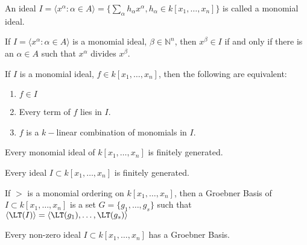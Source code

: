             \begin{definition}
                An ideal
                $I=\langle{x}^{\alpha}:\alpha\in{A}\rangle%
                  =\{\sum_{\alpha}h_{\alpha}x^\alpha,h_{\alpha}%
                   \in k[x_1,\hdots ,x_n]\}$
                is called a monomial ideal.
            \end{definition}
            \begin{theorem}
                If $I=\langle{x}^\alpha:\alpha\in{A}\rangle$
                is a monomial ideal,
                $\beta\in\mathbb{N}^n$, then $x^\beta\in{I}$
                if and only if there is an $\alpha\in{A}$
                such that $x^{\alpha}$ divides $x^{\beta}$.
            \end{theorem}
            \begin{theorem}
                If $I$ is a monomial ideal,
                $f\in{k}[x_1,\hdots ,x_n]$,
                then the following are equivalent:
                \begin{enumerate}
                    \item $f\in I$
                    \item Every term of $f$ lies in $I$.
                    \item $f$ is a $k-$linear combination of
                          monomials in $I$.
                \end{enumerate}
            \end{theorem}
            \begin{theorem}
                Every monomial ideal of $k[x_{1},\hdots,x_{n}]$
                is finitely generated.
            \end{theorem}
            \begin{theorem}
                Every ideal $I\subset{k}[x_{1},\hdots,x_{n}]$
                is finitely generated.
            \end{theorem}
            \begin{definition}
                If $>$ is a monomial ordering on $k[x_{1},\hdots,x_{n}]$,
                then a Groebner Basis of $I\subset k[x_{1},\hdots,x_{n}]$
                is a set $G=\{g_{1},\hdots,g_{s}\}$ such that
                $\langle\LT(I)\rangle%
                 =\langle \LT(g_1),\hdots,\LT(g_s)\rangle$
            \end{definition}
            \begin{theorem}
                Every non-zero ideal
                $I\subset{k}[x_{1},\hdots,x_{n}]$
                has a Groebner Basis.
            \end{theorem}
